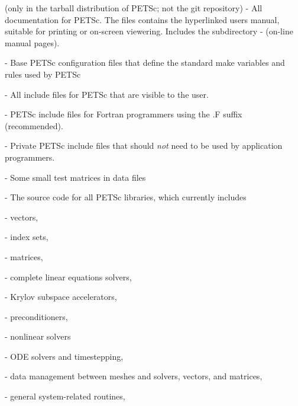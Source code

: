 \begin{tightitemize}
\item {} (only in the tarball distribution of PETSc; not the git repository) - All documentation for PETSc. The files 
                   contains the hyperlinked users manual, suitable for printing
                   or on-screen viewering. Includes the subdirectory
 \subitem -  (on-line manual pages).

\item {} - Base PETSc configuration files that define the standard make variables and rules used by PETSc
\item {} - All include files for PETSc that are visible to the user.
\item {}    - PETSc include files for Fortran programmers using
                                  the .F suffix (recommended).
\item {}    - Private PETSc include files that should {\em not}
                                 need to be used by application programmers.
\item {} - Some small test matrices in data files
\item {} - The source code for all PETSc libraries, which
                  currently includes
 \begin{tightitemize}
 \item {} - vectors,
   \begin{tightitemize}
     \item {} - index sets,
   \end{tightitemize}
 \item {} - matrices,
 \item {} - complete linear equations solvers,
 \begin{tightitemize}
   \item {} - Krylov subspace accelerators,
   \item {} - preconditioners,
 \end{tightitemize}
 \item {} - nonlinear solvers
 \item {} - ODE solvers and timestepping,
 \item {} - data management between meshes and solvers, vectors, and matrices,
 \item {} - general system-related routines,
 \begin{tightitemize}

\end{tightitemize}
\end{tightitemize}
\end{tightitemize}
